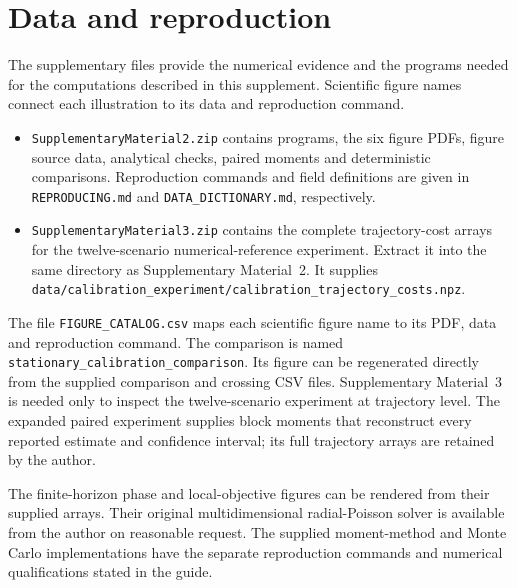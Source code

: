 \documentclass[11pt,a4paper]{article}
\begin{document}
\section{Data and reproduction}
The supplementary files provide the numerical evidence and the programs needed for the computations described in this supplement. Scientific figure names connect each illustration to its data and reproduction command.
\begin{itemize}
\item \nolinkurl{SupplementaryMaterial2.zip} contains programs, the six figure PDFs, figure source data, analytical checks, paired moments and deterministic comparisons. Reproduction commands and field definitions are given in \texttt{REPRODUCING.md} and \texttt{DATA\_DICTIONARY.md}, respectively.
\item \nolinkurl{SupplementaryMaterial3.zip} contains the complete trajectory-cost arrays for the twelve-scenario numerical-reference experiment. Extract it into the same directory as Supplementary Material~2. It supplies \nolinkurl{data/calibration_experiment/calibration_trajectory_costs.npz}.
\end{itemize}
The file \nolinkurl{FIGURE_CATALOG.csv} maps each scientific figure name to its PDF, data and reproduction command. The comparison is named \nolinkurl{stationary_calibration_comparison}. Its figure can be regenerated directly from the supplied comparison and crossing CSV files. Supplementary Material~3 is needed only to inspect the twelve-scenario experiment at trajectory level. The expanded paired experiment supplies block moments that reconstruct every reported estimate and confidence interval; its full trajectory arrays are retained by the author.

The finite-horizon phase and local-objective figures can be rendered from their supplied arrays. Their original multidimensional radial-Poisson solver is available from the author on reasonable request. The supplied moment-method and Monte Carlo implementations have the separate reproduction commands and numerical qualifications stated in the guide.
\end{document}
